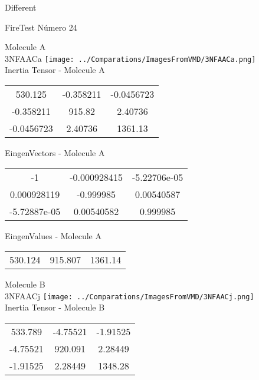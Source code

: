 \begin{center}
\vtab
\vtab
\textcolor{NavyBlue}{\Large Different}
\end{center}

 \newpage

\vtab[-2cm]
\begin{center}
{\large FireTest \tab Número 24}
\end{center}
\begin{multicols}{2}
\begin{center}

Molecule A \\ 
3NFAACa
\texttt{[image: ../Comparations/ImagesFromVMD/3NFAACa.png]}
\\
Inertia Tensor - Molecule A \\
\vtab

\begin{tabular}{|c c c|}
530.125	 & 	-0.358211	 & 	-0.0456723	 \\
-0.358211	 & 	915.82	 & 	2.40736	 \\
-0.0456723	 & 	2.40736	 & 	1361.13
\end{tabular}

\vtab
 EingenVectors - Molecule A     \\
\vtab
\begin{tabular}{|c c c|}
-1	 & 	-0.000928415	 & 	-5.22706e-05	 \\
0.000928119	 & 	-0.999985	 & 	0.00540587	 \\
-5.72887e-05	 & 	0.00540582	 & 	0.999985
\end{tabular}

\vtab
 EingenValues - Molecule A     \\
\vtab
\begin{tabular}{|c c c|}
530.124	 & 	915.807	 & 	1361.14	 \\
\end{tabular}
\columnbreak

Molecule B \\ 
3NFAACj
\texttt{[image: ../Comparations/ImagesFromVMD/3NFAACj.png]}
\\
Inertia Tensor - Molecule B \\
\vtab

\begin{tabular}{|c c c|}
533.789	 & 	-4.75521	 & 	-1.91525	 \\
-4.75521	 & 	920.091	 & 	2.28449	 \\
-1.91525	 & 	2.28449	 & 	1348.28
\end{tabular}


\end{center}
\end{multicols}

